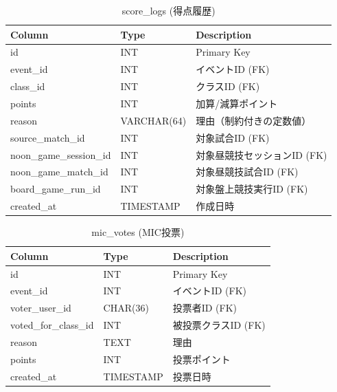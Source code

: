\documentclass[paper=a4, fontsize=11pt]{jlreq}
\begin{document}
\begin{table}[H]
    \centering
    \caption{score\_logs (得点履歴)}
    \begin{tabularx}{\textwidth}{|l|l|X|}
        \toprule
        Column & Type & Description \\
        \midrule
        id & INT & Primary Key \\
        event\_id & INT & イベントID (FK) \\
        class\_id & INT & クラスID (FK) \\
        points & INT & 加算/減算ポイント \\
        reason & VARCHAR(64) & 理由（制約付きの定数値） \\
        source\_match\_id & INT & 対象試合ID (FK) \\
        noon\_game\_session\_id & INT & 対象昼競技セッションID (FK) \\
        noon\_game\_match\_id & INT & 対象昼競技試合ID (FK) \\
        board\_game\_run\_id & INT & 対象盤上競技実行ID (FK) \\
        created\_at & TIMESTAMP & 作成日時 \\
        \bottomrule
    \end{tabularx}
\end{table}

\begin{table}[H]
    \centering
    \caption{mic\_votes (MIC投票)}
    \begin{tabularx}{\textwidth}{|l|l|X|}
        \toprule
        Column & Type & Description \\
        \midrule
        id & INT & Primary Key \\
        event\_id & INT & イベントID (FK) \\
        voter\_user\_id & CHAR(36) & 投票者ID (FK) \\
        voted\_for\_class\_id & INT & 被投票クラスID (FK) \\
        reason & TEXT & 理由 \\
        points & INT & 投票ポイント \\
        created\_at & TIMESTAMP & 投票日時 \\
        \bottomrule
    \end{tabularx}
\end{table}
\end{document}
